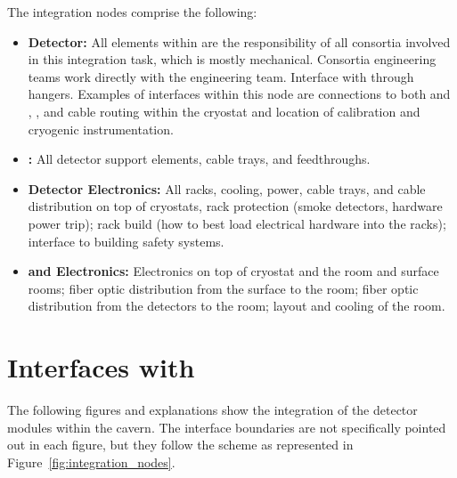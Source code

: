 The integration nodes comprise the following:
\begin{itemize}
\item {\bf Detector:} All  elements within  are the responsibility of all consortia involved in
  this integration task, which is mostly mechanical. Consortia
  engineering teams work directly with the  engineering team.
  Interface with  through hangers. Examples of interfaces within
  this node are  connections to both  and , , and
   cable routing within the cryostat and location of calibration and
  cryogenic instrumentation. 
\item {\bf {}:} All detector support elements,
  cable trays, and feedthroughs.
\item {\bf Detector Electronics:} All racks, cooling, power, cable
  trays, and cable distribution on top of cryostats, rack protection
  (smoke detectors, hardware power trip); rack build (how to best load electrical hardware into the racks); interface to
  building safety systems. 
\item {\bf {} and Electronics:} Electronics on top of cryostat and
  the   room and surface rooms; fiber optic distribution from
  the surface to the   room; fiber optic distribution from the
  detectors to the   room; layout and cooling of the  
  room. 
\end{itemize}

\section{Interfaces with }
\label{sec:inter-lbnf-interf}
The following figures and explanations show the
integration of the detector modules within the cavern. The interface
boundaries are not specifically pointed out in each figure, but they
follow the scheme as represented in
Figure~\ref{fig:integration_nodes}.

